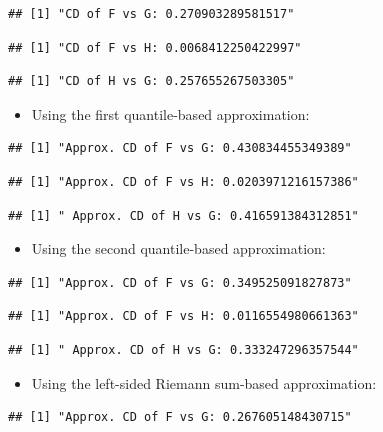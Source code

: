\documentclass[
]{article}
\providecommand{\tightlist}{%
  \setlength{\itemsep}{0pt}\setlength{\parskip}{0pt}}
\begin{document}
\begin{verbatim}
## [1] "CD of F vs G: 0.270903289581517"
\end{verbatim}

\begin{verbatim}
## [1] "CD of F vs H: 0.0068412250422997"
\end{verbatim}

\begin{verbatim}
## [1] "CD of H vs G: 0.257655267503305"
\end{verbatim}

\begin{itemize}
\tightlist
\item
  Using the first quantile-based approximation:
\end{itemize}

\begin{verbatim}
## [1] "Approx. CD of F vs G: 0.430834455349389"
\end{verbatim}

\begin{verbatim}
## [1] "Approx. CD of F vs H: 0.0203971216157386"
\end{verbatim}

\begin{verbatim}
## [1] " Approx. CD of H vs G: 0.416591384312851"
\end{verbatim}

\begin{itemize}
\tightlist
\item
  Using the second quantile-based approximation:
\end{itemize}

\begin{verbatim}
## [1] "Approx. CD of F vs G: 0.349525091827873"
\end{verbatim}

\begin{verbatim}
## [1] "Approx. CD of F vs H: 0.0116554980661363"
\end{verbatim}

\begin{verbatim}
## [1] " Approx. CD of H vs G: 0.333247296357544"
\end{verbatim}

\begin{itemize}
\tightlist
\item
  Using the left-sided Riemann sum-based approximation:
\end{itemize}

\begin{verbatim}
## [1] "Approx. CD of F vs G: 0.267605148430715"
\end{verbatim}
\end{document}
